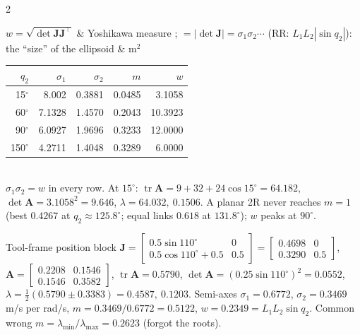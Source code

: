 \begin{multicols}{2}
\begin{fbx}
\begin{symbols}
$w=\sqrt{\det\mathbf J\mathbf J^\top}$ & Yoshikawa measure \added; $=|\det\mathbf J|=\sigma_1\sigma_2\cdots$ (RR: $L_1L_2|\sin q_2|$): the ``size'' of the ellipsoid & m$^2$\\
\end{symbols}
\end{fbx}
\begin{worked}[RR $L=(3,4)$, position block (slides' RR), singular values, $m$, $w$]
\begin{tabular}{@{}rrrrr@{}}\toprule $q_2$&$\sigma_1$&$\sigma_2$&$m$&$w$\\\midrule
15$^\circ$&8.002&0.3881&0.0485&3.1058\\60$^\circ$&7.1328&1.4570&0.2043&10.3923\\90$^\circ$&6.0927&1.9696&0.3233&12.0000\\150$^\circ$&4.2711&1.4048&0.3289&6.0000\\\bottomrule\end{tabular}\\
$\sigma_1\sigma_2=w$ in every row. At $15^\circ$: $\operatorname{tr}\mathbf A=9+32+24\cos15^\circ=64.182$, $\det\mathbf A=3.1058^2=9.646$, $\lambda=64.032,\ 0.1506$. A planar 2R never reaches $m=1$ (best $0.4267$ at $q_2\approx125.8^\circ$; equal links $0.618$ at $131.8^\circ$); $w$ peaks at $90^\circ$. \chk
\end{worked}
\begin{worked}[equal links $L_1=L_2=0.5$ m, $q_2=110^\circ$ (any $q_1$)]
Tool-frame position block $\mathbf J=\begin{bmatrix}0.5\sin110^\circ&0\\0.5\cos110^\circ+0.5&0.5\end{bmatrix}=\begin{bmatrix}0.4698&0\\0.3290&0.5\end{bmatrix}$, $\mathbf A=\begin{bmatrix}0.2208&0.1546\\0.1546&0.3582\end{bmatrix}$, $\operatorname{tr}\mathbf A=0.5790$, $\det\mathbf A=(0.25\sin110^\circ)^2=0.0552$, $\lambda=\tfrac12(0.5790\pm0.3383)=0.4587,\ 0.1203$. Semi-axes $\sigma_1=0.6772$, $\sigma_2=0.3469$ m/s per rad/s, $m=0.3469/0.6772=0.5122$, $w=0.2349=L_1L_2\sin q_2$. Common wrong $m=\lambda_{\min}/\lambda_{\max}=0.2623$ (forgot the roots). \chk

\end{worked}
\end{multicols}
